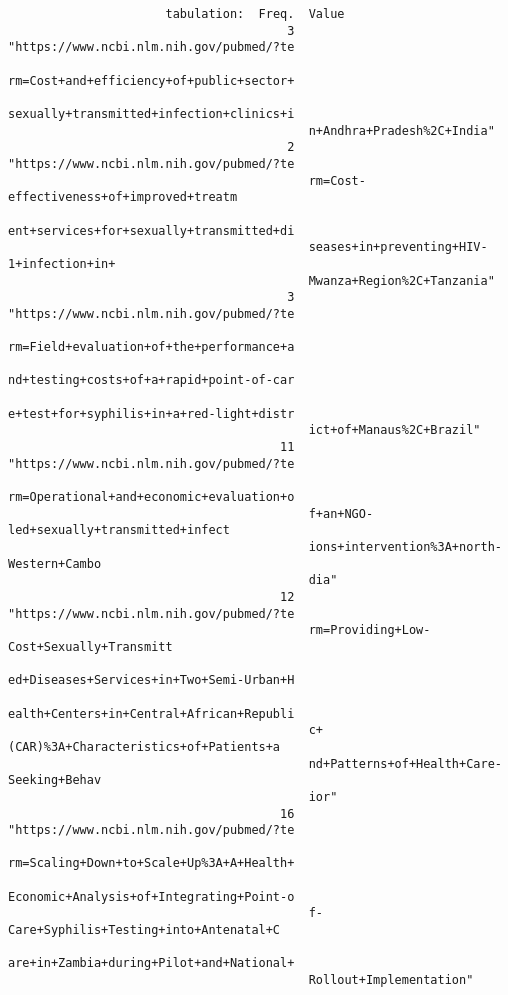 \documentclass{article}
\begin{document}
\begin{verbatim}
                      tabulation:  Freq.  Value
                                       3  "https://www.ncbi.nlm.nih.gov/pubmed/?te
                                          rm=Cost+and+efficiency+of+public+sector+
                                          sexually+transmitted+infection+clinics+i
                                          n+Andhra+Pradesh%2C+India"
                                       2  "https://www.ncbi.nlm.nih.gov/pubmed/?te
                                          rm=Cost-effectiveness+of+improved+treatm
                                          ent+services+for+sexually+transmitted+di
                                          seases+in+preventing+HIV-1+infection+in+
                                          Mwanza+Region%2C+Tanzania"
                                       3  "https://www.ncbi.nlm.nih.gov/pubmed/?te
                                          rm=Field+evaluation+of+the+performance+a
                                          nd+testing+costs+of+a+rapid+point-of-car
                                          e+test+for+syphilis+in+a+red-light+distr
                                          ict+of+Manaus%2C+Brazil"
                                      11  "https://www.ncbi.nlm.nih.gov/pubmed/?te
                                          rm=Operational+and+economic+evaluation+o
                                          f+an+NGO-led+sexually+transmitted+infect
                                          ions+intervention%3A+north-Western+Cambo
                                          dia"
                                      12  "https://www.ncbi.nlm.nih.gov/pubmed/?te
                                          rm=Providing+Low-Cost+Sexually+Transmitt
                                          ed+Diseases+Services+in+Two+Semi-Urban+H
                                          ealth+Centers+in+Central+African+Republi
                                          c+(CAR)%3A+Characteristics+of+Patients+a
                                          nd+Patterns+of+Health+Care-Seeking+Behav
                                          ior"
                                      16  "https://www.ncbi.nlm.nih.gov/pubmed/?te
                                          rm=Scaling+Down+to+Scale+Up%3A+A+Health+
                                          Economic+Analysis+of+Integrating+Point-o
                                          f-Care+Syphilis+Testing+into+Antenatal+C
                                          are+in+Zambia+during+Pilot+and+National+
                                          Rollout+Implementation"
          

\end{verbatim}
\end{document}
